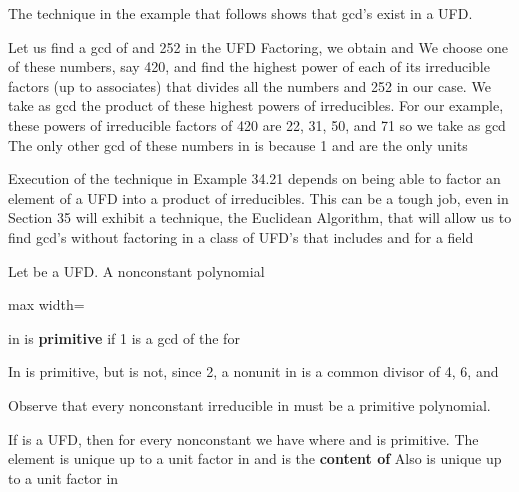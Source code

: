 \documentclass[11pt,oneside]{article}
\begin{document}
\begin{BookBody}
The technique in the example that follows shows that gcd’s exist in a UFD.

 Let us find a gcd of  and 252 in the UFD  Factoring, we obtain   and  We choose one of these numbers, say 420, and find the highest power of each of its irreducible factors (up to associates) that divides all the numbers and 252 in our case. We take as gcd the product of these highest powers of irreducibles. For our example, these powers of irreducible factors of 420 are 22, 31, 50, and 71 so we take as gcd  The only other gcd of these numbers in  is  because 1 and  are the only units\BookEnd{\blacktriangle}

Execution of the technique in Example 34.21 depends on being able to factor an element of a UFD into a product of irreducibles. This can be a tough job, even in  Section 35 will exhibit a technique, the Euclidean Algorithm, that will allow us to find gcd’s without factoring in a class of UFD’s that includes  and  for a field 

 Let  be a UFD. A nonconstant polynomial

\begin{center}\begin{adjustbox}{max width=\linewidth}\end{adjustbox}\end{center}

\noindent in  is\textbf{ primitive} if 1 is a gcd of the  for  \BookEnd{\blacksquare}

 In  is primitive, but  is not, since 2, a nonunit in  is a common divisor of 4, 6, and \BookEnd{\blacktriangle}

Observe that every nonconstant irreducible in  must be a primitive polynomial.

 If  is a UFD, then for every nonconstant  we have  where  and  is primitive. The element  is unique up to a unit factor in  and is the\textbf{ content of}  Also  is unique up to a unit factor in 

\end{BookBody}
\end{document}
